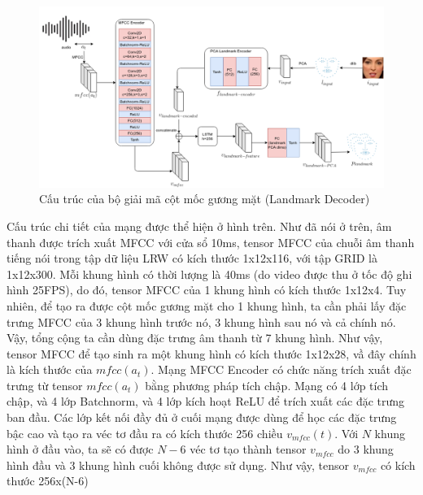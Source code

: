 \begin{figure}[H]
    \centering
    \includegraphics[width=15cm]{./content/materials/landmark_decoder.png}
    \caption{Cấu trúc của bộ giải mã cột mốc gương mặt (Landmark Decoder)}
\end{figure}

Cấu trúc chi tiết của mạng được thể hiện ở hình trên. Như đã nói ở trên, âm thanh được trích xuất MFCC với cửa sổ 10ms, tensor MFCC của chuỗi âm thanh tiếng nói trong tập dữ liệu LRW có kích thước 1x12x116, với tập GRID là 1x12x300. Mỗi khung hình có thời lượng là 40ms (do video được thu ở tốc độ ghi hình 25FPS), do đó, tensor MFCC của 1 khung hình có kích thước 1x12x4. Tuy nhiên, để tạo ra được cột mốc gương mặt cho 1 khung hình, ta cần phải lấy đặc trưng MFCC của 3 khung hình trước nó, 3 khung hình sau nó và cả chính nó. Vậy, tổng cộng ta cần dùng đặc trưng âm thanh từ 7 khung hình. Như vậy, tensor MFCC để tạo sinh ra một khung hình có kích thước 1x12x28, vầ đây chính là kích thước của $mfcc(a_t)$. Mạng MFCC Encoder có chức năng trích xuất đặc trưng từ tensor $mfcc(a_t)$ bằng phương pháp tích chập. Mạng có 4 lớp tích chập, và 4 lớp Batchnorm, và 4 lớp kích hoạt ReLU để trích xuất các đặc trưng ban đầu. Các lớp kết nối đầy đủ ở cuối mạng được dùng để học các đặc trưng bậc cao và tạo ra véc tơ đầu ra có kích thước 256 chiều $v_{mfcc}(t)$. Với $N$ khung hình ở đầu vào, ta sẽ có được $N-6$ véc tơ tạo thành tensor $v_{mfcc}$ do 3 khung hình đầu và 3 khung hình cuối không được sử dụng. Như vậy, tensor $v_{mfcc}$ có kích thước 256x(N-6)

